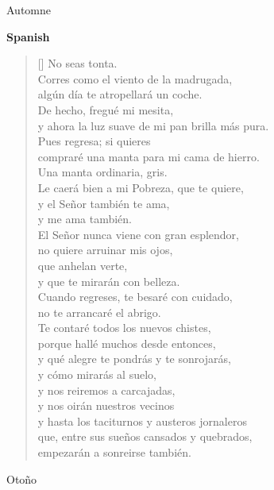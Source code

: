 \documentclass[a4paper,12pt,twoside,final]{book}
\begin{document}
Automne

\newpage


\noindent \textbf{Spanish}


\settowidth{\versewidth}{y ahora la luz suave de mi pan brilla más pura.}

\begin{verse}[\versewidth]
  No seas tonta. \\
  Corres como el viento de la madrugada, \\
  algún día te atropellará un coche. \\
  De hecho, fregué mi mesita, \\
  y ahora la luz suave de mi pan brilla más pura. \\
  Pues regresa; si quieres \\
  compraré una manta para mi cama de hierro. \\
  Una manta ordinaria, gris. \\
  Le caerá bien a mi Pobreza, que te quiere, \\
  y el Señor también te ama, \\
  y me ama también. \\
  El Señor nunca viene con gran esplendor, \\
  no quiere arruinar mis ojos, \\
  que anhelan verte, \\
  y que te mirarán con belleza. \\
  Cuando regreses, te besaré con cuidado, \\
  no te arrancaré el abrigo. \\
  Te contaré todos los nuevos chistes, \\
  porque hallé muchos desde entonces, \\
  y qué alegre te pondrás y te sonrojarás, \\
  y cómo mirarás al suelo, \\
  y nos reiremos a carcajadas, \\
  y nos oirán nuestros vecinos \\
  y hasta los taciturnos y austeros jornaleros \\
  que, entre sus sueños cansados y quebrados, \\
  empezarán a sonreirse también. \\
\end{verse}

Otoño
\end{document}
